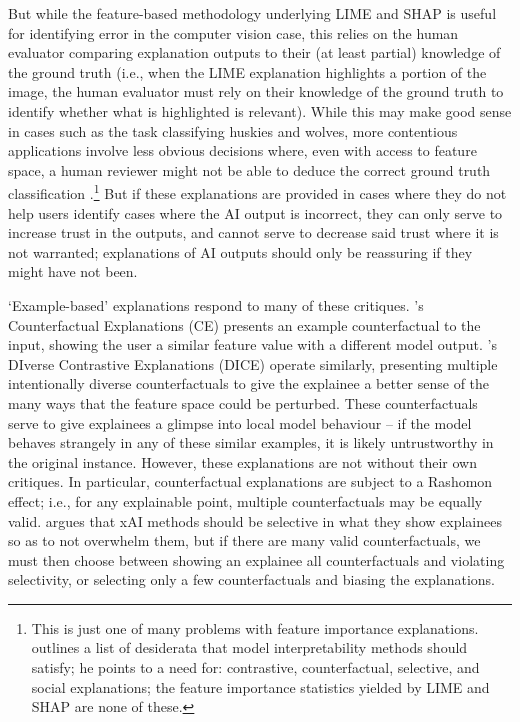 But while the feature-based methodology underlying LIME and SHAP is useful for identifying error in the computer vision case, this relies on the human evaluator comparing explanation outputs to their (at least partial) knowledge of the ground truth (i.e., when the LIME explanation highlights a portion of the image, the human evaluator must rely on their knowledge of the ground truth to identify whether what is highlighted is relevant). While this may make good sense in cases such as the task classifying huskies and wolves, more contentious applications involve less obvious decisions where, even with access to feature space, a human reviewer might not be able to deduce the correct ground truth classification \cite{kumar_problems_2020,markus_role_2021}.\footnote{This is just one of many problems with feature importance explanations. \textcite{miller_explanation_2017} outlines a list of desiderata that model interpretability methods should satisfy; he points to a need for: contrastive, counterfactual, selective, and social explanations; the feature importance statistics yielded by LIME and SHAP are none of these.} But if these explanations are provided in cases where they do not help users identify cases where the AI output is incorrect, they can only serve to increase trust in the outputs, and cannot serve to decrease said trust where it is not warranted; explanations of AI outputs should only be reassuring if they might have not been.

`Example-based' explanations respond to many of these critiques. \textcite{wachter_counterfactual_2017}'s Counterfactual Explanations (CE) presents an example counterfactual to the input, showing the user a similar feature value with a different model output. \textcite{mothilal_explaining_2019}'s DIverse Contrastive Explanations (DICE) operate similarly, presenting multiple intentionally diverse counterfactuals to give the explainee a better sense of the many ways that the feature space could be perturbed. These counterfactuals serve to give explainees a glimpse into local model behaviour – if the model behaves strangely in any of these similar examples, it is likely untrustworthy in the original instance. However, these explanations are not without their own critiques. In particular, counterfactual explanations are subject to a Rashomon effect; i.e., for any explainable point, multiple counterfactuals may be equally valid. \textcite{miller_explanation_2017} argues that xAI methods should be selective in what they show explainees so as to not overwhelm them, but if there are many valid counterfactuals, we must then choose between showing an explainee all counterfactuals and violating selectivity, or selecting only a few counterfactuals and biasing the explanations.

